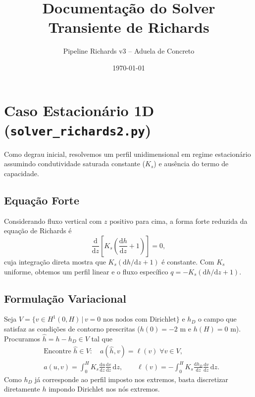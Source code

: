 \documentclass[a4paper,12pt]{article}
\title{\textbf{Documentação do Solver Transiente de Richards}}
\author{Pipeline Richards v3 -- Aduela de Concreto}
\date{\today}
\begin{document}
\maketitle

\section{Caso Estacionário 1D (\texttt{solver\_richards2.py})}
Como degrau inicial, resolvemos um perfil unidimensional em regime estacionário assumindo condutividade saturada constante ($K_s$) e ausência do termo de capacidade.

\subsection{Equação Forte}
Considerando fluxo vertical com $z$ positivo para cima, a forma forte reduzida da equação de Richards é
\begin{equation}
    \frac{\mathrm{d}}{\mathrm{d}z}\left[K_s\left(\frac{\mathrm{d}h}{\mathrm{d}z}+1\right)\right]=0,
\end{equation}
cuja integração direta mostra que $K_s(\mathrm{d}h/\mathrm{d}z + 1)$ é constante. Com $K_s$ uniforme, obtemos um perfil linear e o fluxo específico $q=-K_s(\mathrm{d}h/\mathrm{d}z+1)$.

\subsection{Formulação Variacional}
Seja $V=\{v\in H^1(0,H)\,|\, v=0 \text{ nos nodos com Dirichlet}\}$ e $h_D$ o campo que satisfaz as condições de contorno prescritas ($h(0)=-2$ m e $h(H)=0$ m). Procuramos $\hat h = h - h_D \in V$ tal que
\begin{align}
    &\text{Encontre } \hat h \in V: \quad a(\hat h, v) = \ell(v) \; \forall v \in V,\\
    &a(u,v) = \int_0^H K_s \frac{\mathrm{d}u}{\mathrm{d}z}\frac{\mathrm{d}v}{\mathrm{d}z}\,\mathrm{d}z, \qquad \ell(v) = - \int_0^H K_s \frac{\mathrm{d}h_D}{\mathrm{d}z}\frac{\mathrm{d}v}{\mathrm{d}z}\,\mathrm{d}z.
\end{align}
Como $h_D$ já corresponde ao perfil imposto nos extremos, basta discretizar diretamente $h$ impondo Dirichlet nos nós extremos.
\end{document}
